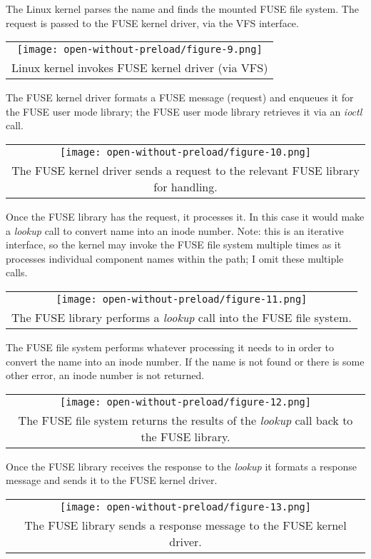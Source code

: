 \documentclass[a4paper,11pt]{article}
\begin{document}
The Linux kernel parses the name and finds the mounted FUSE file system.  The request is passed to the FUSE kernel driver, via the VFS interface.

\begin{tabular}{c}
    \texttt{[image: open-without-preload/figure-9.png]}
    \tabularnewline
    Linux kernel invokes FUSE kernel driver (via VFS)
\end{tabular}

The FUSE kernel driver formats a FUSE message (request) and enqueues it for the FUSE user mode library; the FUSE user mode library retrieves it via an \textit{ioctl} call.

\begin{tabular}{c}
    \texttt{[image: open-without-preload/figure-10.png]}
    \tabularnewline
    The FUSE kernel driver sends a request to the relevant FUSE library for handling.
\end{tabular}

Once the FUSE library has the request, it processes it. In this case it would make a \textit{lookup} call to convert name into an inode number.  Note: this is an iterative interface, so the kernel may invoke the FUSE file system multiple times as it processes individual component names within the path; I omit these multiple calls.

\begin{tabular}{c}
    \texttt{[image: open-without-preload/figure-11.png]}
    \tabularnewline
    The FUSE library performs a \textit{lookup} call into the FUSE file system.
\end{tabular}

The FUSE file system performs whatever processing it needs to in order to convert the name into an inode number. If the name is not found or there is some other error, an inode number is not returned.

\begin{tabular}{c}
    \texttt{[image: open-without-preload/figure-12.png]}
    \tabularnewline
    The FUSE file system returns the results of the \textit{lookup} call back to the FUSE library.
\end{tabular}

Once the FUSE library receives the response to the \textit{lookup} it formats a response message and sends it to the FUSE kernel driver.

\begin{tabular}{c}
    \texttt{[image: open-without-preload/figure-13.png]}
    \tabularnewline
    The FUSE library sends a response message to the FUSE kernel driver.
\end{tabular}
\end{document}
